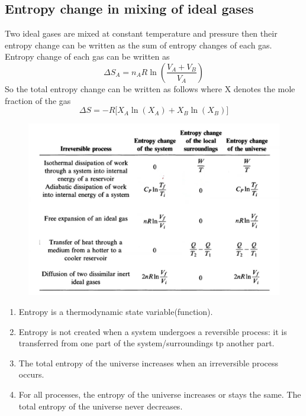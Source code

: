 \documentclass[12pt]{article}
\begin{document}
\subsection{Entropy change in mixing of ideal gases}
	Two ideal gases are mixed at constant temperature and pressure then their entropy change can be written as the sum of entropy changes of each gas. Entropy change of each gas can be written as
\begin{equation}
		\Delta S_A=n_AR\ln(\frac{V_A+V_B}{V_A}) 
\end{equation}
So the total entropy change can be written as follows where X denotes the mole fraction of the gas
\begin{equation}
	\Delta S=-R\Big[X_A\ln(X_A)+X_B\ln(X_B)\Big]
\end{equation}

\begin{figure}[h]
	\includegraphics[scale=0.5]{tableofentropy.jpg}
	\centering
\end{figure}

\begin{tcolorbox}[title=Second Law of Thermodynamics]
	\begin{enumerate}
		\item Entropy is a thermodynamic state variable(function).
	    \item Entropy is not created when a system undergoes a reversible process: it is transferred from one part of the system/surroundings tp another part.
	    \item The total entropy of the universe increases when an irreversible process occurs.
	    \item For all processes, the entropy of the universe increases or stays the same. The total entropy of the universe never decreases. 
	\end{enumerate}
\end{tcolorbox}
\end{document}
